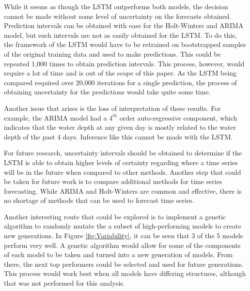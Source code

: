 While it seems as though the LSTM outperforms both models, the decision cannot be made without some level of uncertainty on the forecasts obtained. Prediction intervals can be obtained with ease for the Holt-Winters and ARIMA model, but such intervals are not as easily obtained for the LSTM. To do this, the framework of the LSTM would have to be retrained on bootstrapped samples of the original training data and used to make predictions. This could be repeated 1,000 times to obtain prediction intervals. This process, however, would require a lot of time and is out of the scope of this paper. As the LSTM being compared required over 20,000 iterations for a single prediction, the process of obtaining uncertainty for the predictions would take quite some time.

Another issue that arises is the loss of interpretation of these results. For example, the ARIMA model had a $4^{th}$ order auto-regressive component, which indicates that the water depth at any given day is mostly related to the water depth of the past 4 days. Inference like this cannot be made with the LSTM.

For future research, uncertainty intervals should be obtained to determine if the LSTM is able to obtain higher levels of certainty regarding where a time series will be in the future when compared to other methods. Another step that could be taken for future work is to compare additional methods for time series forecasting. While ARIMA and Holt-Winters are common and effective, there is no shortage of methods that can be used to forecast time series.

Another interesting route that could be explored is to implement a genetic algorithm to randomly mutate the a subset of high-performing models to create new generations. In Figure \ref{fig:Variability}, it can be seen that 3 of the 5 models perform very well. A genetic algorithm would allow for some of the components of each model to be taken and turned into a new generation of models. From there, the next top performers could be selected and used for future generations. This process would work best when all models have differing structures, although that was not performed for this analysis.